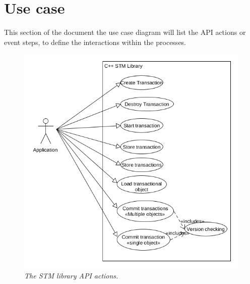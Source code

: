 \documentclass[12pt]{article}
\begin{document}
\newpage
\section{Use case}
This section of the document the use case diagram will list the API actions or event steps, to define the interactions within the processes.

\begin{figure}[h!]
\centering
\includegraphics[scale=0.35]{Pictures/usecase.png}
\caption{\textit{\color{gray}The STM library API actions.}}
\end{figure}
\end{document}
